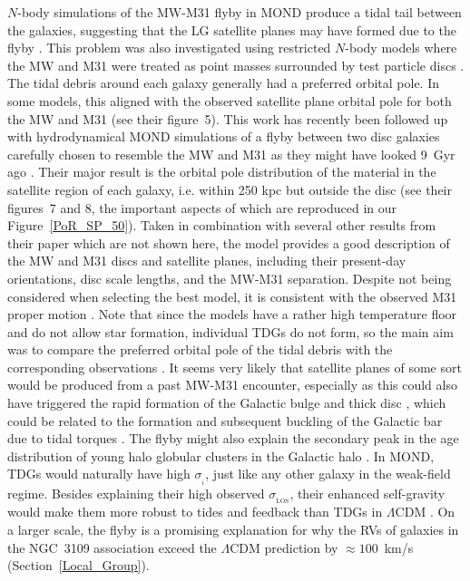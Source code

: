 \documentclass[fleqn,usenatbib,useAMS]{mnras} %
\begin{document}
$N$-body simulations of the MW-M31 flyby in MOND produce a tidal tail between the galaxies, suggesting that the LG satellite planes may have formed due to the flyby \citep{Bilek_2018}. This problem was also investigated using restricted $N$-body models where the MW and M31 were treated as point masses surrounded by test particle discs \citep{Banik_Ryan_2018}. The tidal debris around each galaxy generally had a preferred orbital pole. In some models, this aligned with the observed satellite plane orbital pole for both the MW and M31 (see their figure~5). This work has recently been followed up with hydrodynamical MOND simulations of a flyby between two disc galaxies carefully chosen to resemble the MW and M31 as they might have looked 9~Gyr ago \citep{Banik_2022_satellite_plane}. Their major result is the orbital pole distribution of the material in the satellite region of each galaxy, i.e. within 250 kpc but outside the disc (see their figures~7 and 8, the important aspects of which are reproduced in our Figure~\ref{PoR_SP_50}). Taken in combination with several other results from their paper which are not shown here, the model provides a good description of the MW and M31 discs and satellite planes, including their present-day orientations, disc scale lengths, and the MW-M31 separation. Despite not being considered when selecting the best model, it is consistent with the observed M31 proper motion \citep{Salomon_2021}. Note that since the models have a rather high temperature floor and do not allow star formation, individual TDGs do not form, so the main aim was to compare the preferred orbital pole of the tidal debris with the corresponding observations \citep{Pawlowski_2013_LG, Pawlowski_2013_VPOS}. It seems very likely that satellite planes of some sort would be produced from a past MW-M31 encounter, especially as this could also have triggered the rapid formation of the Galactic bulge \citep{Ballero_2007} and thick disc \citep{Kilic_2017}, which could be related to the formation and subsequent buckling of the Galactic bar due to tidal torques \citep{Grady_2020}. The flyby might also explain the secondary peak in the age distribution of young halo globular clusters in the Galactic halo \citep[figure~9 of][]{Mackey_2004}. In MOND, TDGs would naturally have high $\sigma_{_i}$, just like any other galaxy in the weak-field regime. Besides explaining their high observed $\sigma_{_\text{LOS}}$, their enhanced self-gravity would make them more robust to tides and feedback than TDGs in $\Lambda$CDM \citep{Renaud_2016}. On a larger scale, the flyby is a promising explanation for why the RVs of galaxies in the NGC~3109 association exceed the $\Lambda$CDM prediction by $\approx 100$~km/s (Section~\ref{Local_Group}).
\end{document}
